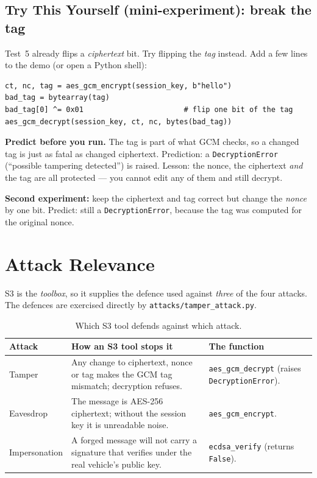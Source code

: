 \documentclass[11pt,a4paper]{article}
\begin{document}
\subsection{Try This Yourself (mini-experiment): break the tag}
Test~5 already flips a \emph{ciphertext} bit. Try flipping the \emph{tag}
instead. Add a few lines to the demo (or open a Python shell):
\begin{lstlisting}[style=term]
ct, nc, tag = aes_gcm_encrypt(session_key, b"hello")
bad_tag = bytearray(tag)
bad_tag[0] ^= 0x01                       # flip one bit of the tag
aes_gcm_decrypt(session_key, ct, nc, bytes(bad_tag))
\end{lstlisting}
\textbf{Predict before you run.} The tag is part of what GCM checks, so a changed
tag is just as fatal as changed ciphertext. Prediction: a
\texttt{DecryptionError} (``possible tampering detected'') is raised. Lesson: the
nonce, the ciphertext \emph{and} the tag are all protected --- you cannot edit
any of them and still decrypt.

\textbf{Second experiment:} keep the ciphertext and tag correct but change the
\emph{nonce} by one bit. Predict: still a \texttt{DecryptionError}, because the
tag was computed for the original nonce.

\section{Attack Relevance}

S3 is the \emph{toolbox}, so it supplies the defence used against \emph{three}
of the four attacks. The defences are exercised directly by
\texttt{attacks/tamper\_attack.py}.

\begin{table}[h]
\centering
\small
\begin{tabular}{@{}p{2.6cm} p{6.0cm} p{4.9cm}@{}}
\toprule
\textbf{Attack} & \textbf{How an S3 tool stops it} & \textbf{The function}\\
\midrule
Tamper & Any change to ciphertext, nonce or tag makes the GCM tag mismatch;
decryption refuses. & \texttt{aes\_gcm\_decrypt} (raises \texttt{DecryptionError}).\\
Eavesdrop & The message is AES-256 ciphertext; without the session key it is
unreadable noise. & \texttt{aes\_gcm\_encrypt}.\\
Impersonation & A forged message will not carry a signature that verifies under
the real vehicle's public key. & \texttt{ecdsa\_verify} (returns \texttt{False}).\\
\bottomrule
\end{tabular}
\caption{Which S3 tool defends against which attack.}
\end{table}
\end{document}
